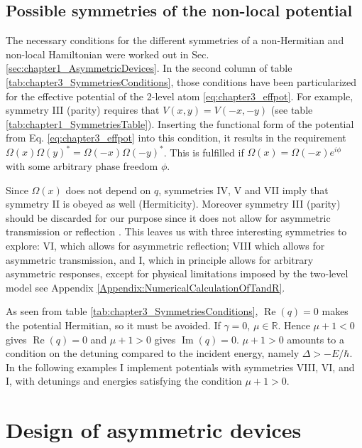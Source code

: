 \subsection{Possible symmetries of the non-local potential}
%
The necessary conditions for the different symmetries of a non-Hermitian and non-local Hamiltonian were worked out in Sec. \ref{sec:chapter1_AsymmetricDevices}. In the second column of table \ref{tab:chapter3_SymmetriesConditions}, those conditions have been particularized for the effective potential of the 2-level atom \eqref{eq:chapter3_effpot}. For example, symmetry III (parity) requires that $V(x,y)=V(-x,-y)$ (see table \ref{tab:chapter1_SymmetriesTable}). Inserting the functional form of the potential from Eq. \eqref{eq:chapter3_effpot} into this condition, it results in the requirement $\Omega(x) \Omega(y)^* = \Omega(-x) \Omega(-y)^*$. This is fulfilled if $\Omega(x)=\Omega(-x)e^{i \phi}$ with some arbitrary phase freedom $\phi$.

Since $\Omega(x)$ does not depend on $q$, symmetries IV, V and VII imply that symmetry II is obeyed as well (Hermiticity).
Moreover symmetry III (parity) should be discarded for our purpose since it does not allow for asymmetric transmission or reflection
\cite{Ruschhaupt2017}.
This leaves us with three interesting symmetries to explore:
VI, which allows for  asymmetric reflection; VIII which allows for asymmetric transmission, and  I,
which in principle allows for arbitrary asymmetric responses, except for physical limitations imposed by
the two-level model see Appendix \ref{Appendix:NumericalCalculationOfTandR}.

As seen from  table \ref{tab:chapter3_SymmetriesConditions}, $\operatorname{Re}(q)=0$ makes the potential Hermitian, so it must be avoided.
If $\gamma=0$,   $\mu \in \mathbb{R}$. Hence $\mu+1<0$ gives $\operatorname{Re}(q)=0$ and $\mu+1>0$ gives
$\operatorname{Im}(q)=0$. $\mu+1>0$ amounts to a condition on the detuning compared to the incident energy, namely $\Delta>-E/\hbar$.
In the following examples I implement potentials with symmetries VIII, VI, and I, with detunings and energies satisfying the condition $\mu+1>0$.


\section{Design of asymmetric devices\label{sec:chapter3_exa}}

